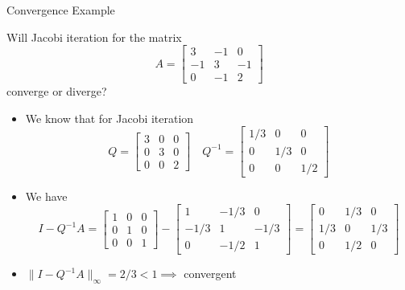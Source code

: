 \documentclass[10pt]{beamer}
\begin{document}
\begin{frame}{Convergence Example}
\begin{example}
    Will Jacobi iteration for the matrix 
        $$A = \begin{bmatrix}
    3 &-1 & 0\\
    -1 &3 &-1\\
    0 &-1 &2
    \end{bmatrix}$$
    converge or diverge?
\end{example}
    
\begin{itemize}
    \item We know that for Jacobi iteration
    $$
    Q = \begin{bmatrix}
    3 &0 & 0\\
    0 &3 &0\\
    0 &0 &2
    \end{bmatrix} \quad Q^{-1} = \begin{bmatrix}
    1/3 &0 & 0\\
    0 & 1/3 &0\\
    0 &0 &1/2
    \end{bmatrix}
    $$
\item We have 
    $$ I - Q^{-1}A = \begin{bmatrix}
    1 &0 & 0\\
    0 &1 &0\\
    0 &0 &1
    \end{bmatrix} - 
    \begin{bmatrix}
    1 &-1/3 & 0\\
    -1/3 &1 &-1/3\\
    0 &-1/2 &1
    \end{bmatrix}=
    \begin{bmatrix}
    0 & 1/3 & 0\\
    1/3 &0 & 1/3\\
    0 & 1/2 &0
    \end{bmatrix}
    $$
\item $\| I - Q^{-1}A\|_\infty = 2/3 < 1 \implies $ convergent
\end{itemize}
\end{frame}
\end{document}
